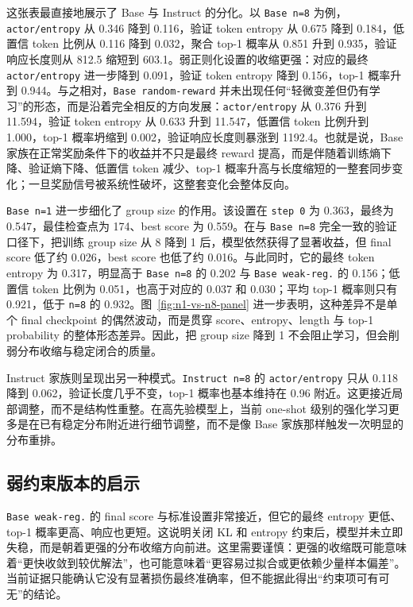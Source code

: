 \documentclass[12pt,a4paper]{ctexart}
\begin{document}
这张表最直接地展示了 Base 与 Instruct 的分化。以 \texttt{Base n=8} 为例，\texttt{actor/entropy} 从 0.346 降到 0.116，验证 token entropy 从 0.675 降到 0.184，低置信 token 比例从 0.116 降到 0.032，聚合 top-1 概率从 0.851 升到 0.935，验证响应长度则从 812.5 缩短到 603.1。弱正则化设置的收缩更强：对应的最终 \texttt{actor/entropy} 进一步降到 0.091，验证 token entropy 降到 0.156，top-1 概率升到 0.944。与之相对，\texttt{Base random-reward} 并未出现任何“轻微变差但仍有学习”的形态，而是沿着完全相反的方向发展：\texttt{actor/entropy} 从 0.376 升到 11.594，验证 token entropy 从 0.633 升到 11.547，低置信 token 比例升到 1.000，top-1 概率坍缩到 0.002，验证响应长度则暴涨到 1192.4。也就是说，Base 家族在正常奖励条件下的收益并不只是最终 reward 提高，而是伴随着训练熵下降、验证熵下降、低置信 token 减少、top-1 概率升高与长度缩短的一整套同步变化；一旦奖励信号被系统性破坏，这整套变化会整体反向。

\texttt{Base n=1} 进一步细化了 group size 的作用。该设置在 \texttt{step 0} 为 0.363，最终为 0.547，最佳检查点为 174、best score 为 0.559。在与 \texttt{Base n=8} 完全一致的验证口径下，把训练 group size 从 8 降到 1 后，模型依然获得了显著收益，但 final score 低了约 0.026，best score 也低了约 0.016。与此同时，它的最终 token entropy 为 0.317，明显高于 \texttt{Base n=8} 的 0.202 与 \texttt{Base weak-reg.} 的 0.156；低置信 token 比例为 0.051，也高于对应的 0.037 和 0.030；平均 top-1 概率则只有 0.921，低于 \texttt{n=8} 的 0.932。图~\ref{fig:n1-vs-n8-panel} 进一步表明，这种差异不是单个 final checkpoint 的偶然波动，而是贯穿 score、entropy、length 与 top-1 probability 的整体形态差异。因此，把 group size 降到 1 不会阻止学习，但会削弱分布收缩与稳定闭合的质量。

Instruct 家族则呈现出另一种模式。\texttt{Instruct n=8} 的 \texttt{actor/entropy} 只从 0.118 降到 0.062，验证长度几乎不变，top-1 概率也基本维持在 0.96 附近。这更接近局部调整，而不是结构性重整。在高先验模型上，当前 one-shot 级别的强化学习更多是在已有稳定分布附近进行细节调整，而不是像 Base 家族那样触发一次明显的分布重排。

\subsection{弱约束版本的启示}

\texttt{Base weak-reg.} 的 final score 与标准设置非常接近，但它的最终 entropy 更低、top-1 概率更高、响应也更短。这说明关闭 KL 和 entropy 约束后，模型并未立即失稳，而是朝着更强的分布收缩方向前进。这里需要谨慎：更强的收缩既可能意味着“更快收敛到较优解法”，也可能意味着“更容易过拟合或更依赖少量样本偏差”。当前证据只能确认它没有显著损伤最终准确率，但不能据此得出“约束项可有可无”的结论。
\end{document}
